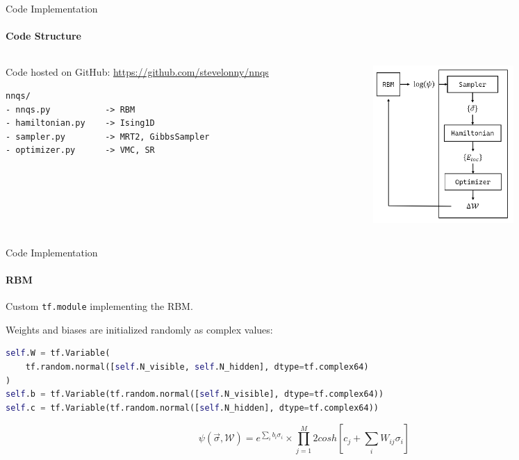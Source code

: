\documentclass{beamer}
\begin{document}
\begin{frame}[fragile]{Code Implementation}
\framesubtitle{Code Structure}
\begin{columns}
\begin{column}{0.5\textwidth}
Code hosted on GitHub: \href{https://github.com/stevelonny/nnqs}{https://github.com/stevelonny/nnqs}
\begin{lstlisting}[style=kaolstplain]
nnqs/
- nnqs.py			-> RBM
- hamiltonian.py	-> Ising1D
- sampler.py		-> MRT2, GibbsSampler
- optimizer.py		-> VMC, SR
\end{lstlisting}
\end{column}
\begin{column}{0.5\textwidth}
\begin{center}
\includegraphics[height=6cm]{images/pipeline.png}
\end{center}
\end{column}
\end{columns}
\end{frame}

\begin{frame}[fragile]{Code Implementation}
\framesubtitle{RBM}

Custom \lstinline[style=kaolstplain]|tf.module| implementing the RBM.
\baselineskip

Weights and biases are initialized randomly as complex values:
\begin{lstlisting}[language=Python, style=kaolstplain]
self.W = tf.Variable(
	tf.random.normal([self.N_visible, self.N_hidden], dtype=tf.complex64)
)
self.b = tf.Variable(tf.random.normal([self.N_visible], dtype=tf.complex64))
self.c = tf.Variable(tf.random.normal([self.N_hidden], dtype=tf.complex64))
\end{lstlisting}

$$\psi\left(\vec{\sigma}, \mathcal{W}\right) = e^{\sum_{i} b_i \sigma_i} \times \prod_{j=1}^{M} {2 cosh\left[c_j + \sum_{i} W_{ij} \sigma_i\right]}$$

\end{frame}
\end{document}
